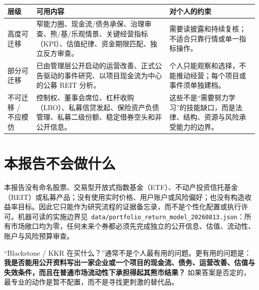\begin{dashboardbox}[迁移优先级]
\begin{tabularx}{\textwidth}{L{2.4cm}X X}
\toprule
\textbf{层级} & \textbf{可用内容} & \textbf{对个人的约束} \\
\midrule
\textcolor{riskgreen}{高度可迁移} & 窄能力圈、现金流/债务承保、治理审查、熊/基/乐观情景、关键经营指标（KPI）、估值纪律、资金期限匹配、独立反方审查。 & 需要读披露和持续复核；不适合只靠行情或单一指标操作。 \\
\textcolor{riskamber}{部分可迁移} & 已由管理层公开启动的运营改善、正式公告驱动的事件研究、以项目现金流为中心的公募 REIT 分析。 & 个人只能观察和选择，不能推动经营；每个项目或事件须单独建档。 \\
\textcolor{riskred}{不可迁移 / 不应模仿} & 控制权、董事会席位、杠杆收购（LBO）、私募信贷发起、保险资产负债管理、私募二级份额、稳定借券空头和非公开信息。 & 这些不是“需要努力学习”的技能缺口，而是法律、结构、资源与风险承受能力的边界。 \\
\bottomrule
\end{tabularx}
\end{dashboardbox}

\section{本报告不会做什么}

本报告没有命名股票、交易型开放式指数基金（ETF）、不动产投资信托基金（REIT）或私募产品；没有使用实时价格、用户账户或风险偏好；也没有构造收益率目标。因此它只能作为研究流程的证据备忘录，而不是个性化配置或执行许可。机器可读的实施边界见\ \texttt{data/portfolio\_return\_model\_20260813.json}：所有市场敞口均为零，任何未来个券都必须先完成独立的公开信息、估值、流动性、账户与风险预算审查。

\begin{riskbox}[先避免错误问题]
“Blackstone / KKR 在买什么？”通常不是个人最有用的问题。更有用的问题是：\textbf{我是否能用公开资料写出一家企业或一个项目的现金流、债务、运营改善、估值与失效条件，而且在普通市场流动性下承担得起其熊市结果？} 如果答案是否定的，最专业的动作是暂不配置，而不是寻找更刺激的替代品。
\end{riskbox}

